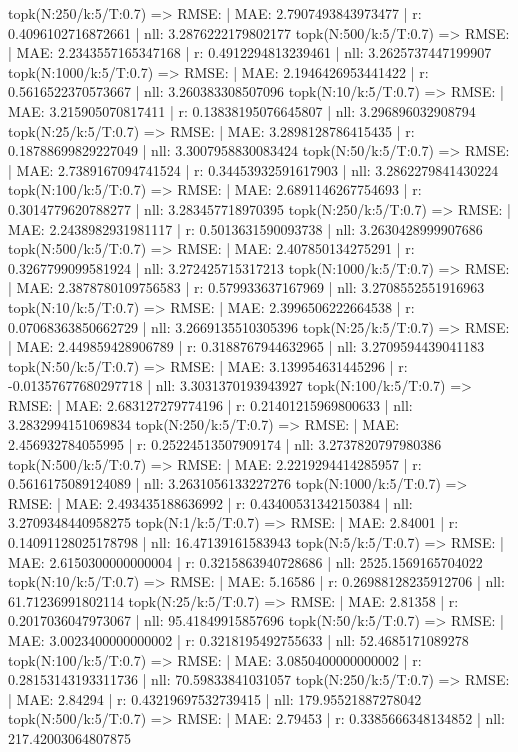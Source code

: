 topk(N:250/k:5/T:0.7) => RMSE: | MAE: 2.7907493843973477 | r: 0.4096102716872661 | nll: 3.2876222179802177
topk(N:500/k:5/T:0.7) => RMSE: | MAE: 2.2343557165347168 | r: 0.4912294813239461 | nll: 3.2625737447199907
topk(N:1000/k:5/T:0.7) => RMSE: | MAE: 2.1946426953441422 | r: 0.5616522370573667 | nll: 3.260383308507096
topk(N:10/k:5/T:0.7) => RMSE: | MAE: 3.215905070817411 | r: 0.13838195076645807 | nll: 3.296896032908794
topk(N:25/k:5/T:0.7) => RMSE: | MAE: 3.2898128786415435 | r: 0.18788699829227049 | nll: 3.3007958830083424
topk(N:50/k:5/T:0.7) => RMSE: | MAE: 2.7389167094741524 | r: 0.34453932591617903 | nll: 3.2862279841430224
topk(N:100/k:5/T:0.7) => RMSE: | MAE: 2.6891146267754693 | r: 0.3014779620788277 | nll: 3.283457718970395
topk(N:250/k:5/T:0.7) => RMSE: | MAE: 2.2438982931981117 | r: 0.5013631590093738 | nll: 3.2630428999907686
topk(N:500/k:5/T:0.7) => RMSE: | MAE: 2.407850134275291 | r: 0.3267799099581924 | nll: 3.272425715317213
topk(N:1000/k:5/T:0.7) => RMSE: | MAE: 2.3878780109756583 | r: 0.579933637167969 | nll: 3.2708552551916963
topk(N:10/k:5/T:0.7) => RMSE: | MAE: 2.3996506222664538 | r: 0.07068363850662729 | nll: 3.2669135510305396
topk(N:25/k:5/T:0.7) => RMSE: | MAE: 2.449859428906789 | r: 0.3188767944632965 | nll: 3.2709594439041183
topk(N:50/k:5/T:0.7) => RMSE: | MAE: 3.139954631445296 | r: -0.01357677680297718 | nll: 3.3031370193943927
topk(N:100/k:5/T:0.7) => RMSE: | MAE: 2.683127279774196 | r: 0.21401215969800633 | nll: 3.2832994151069834
topk(N:250/k:5/T:0.7) => RMSE: | MAE: 2.456932784055995 | r: 0.25224513507909174 | nll: 3.2737820797980386
topk(N:500/k:5/T:0.7) => RMSE: | MAE: 2.2219294414285957 | r: 0.5616175089124089 | nll: 3.2631056133227276
topk(N:1000/k:5/T:0.7) => RMSE: | MAE: 2.493435188636992 | r: 0.43400531342150384 | nll: 3.2709348440958275
topk(N:1/k:5/T:0.7) => RMSE: | MAE: 2.84001 | r: 0.14091128025178798 | nll: 16.47139161583943
topk(N:5/k:5/T:0.7) => RMSE: | MAE: 2.6150300000000004 | r: 0.3215863940728686 | nll: 2525.1569165704022
topk(N:10/k:5/T:0.7) => RMSE: | MAE: 5.16586 | r: 0.26988128235912706 | nll: 61.71236991802114
topk(N:25/k:5/T:0.7) => RMSE: | MAE: 2.81358 | r: 0.2017036047973067 | nll: 95.41849915857696
topk(N:50/k:5/T:0.7) => RMSE: | MAE: 3.0023400000000002 | r: 0.3218195492755633 | nll: 52.4685171089278
topk(N:100/k:5/T:0.7) => RMSE: | MAE: 3.0850400000000002 | r: 0.28153143193311736 | nll: 70.59833841031057
topk(N:250/k:5/T:0.7) => RMSE: | MAE: 2.84294 | r: 0.43219697532739415 | nll: 179.95521887278042
topk(N:500/k:5/T:0.7) => RMSE: | MAE: 2.79453 | r: 0.3385666348134852 | nll: 217.42003064807875
